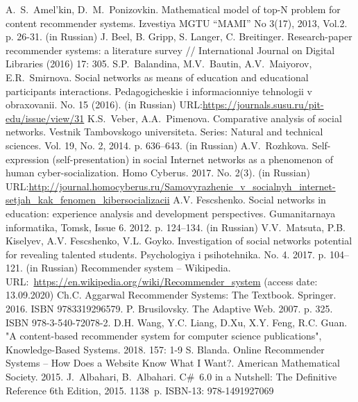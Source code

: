 \documentclass[conference]{IEEEtran}
\begin{document}
\begin{thebibliography}{99}
A.~S.~Amel'kin, D.~M.~Ponizovkin. Mathematical model of top-N problem for content recommender systems. Izvestiya MGTU ``MAMI'' No 3(17), 2013, Vol.2. p. 26-31. (in Russian)
 J. Beel, B. Gripp, S. Langer, C. Breitinger. Research-paper recommender systems: a literature survey // International Journal on Digital Libraries (2016) 17: 305. 
S.P.~Balandina, M.V.~Bautin, A.V.~Maiyorov, E.R.~Smirnova. Social networks as means of education and educational participants interactions. Pedagogicheskie i informacionniye tehnologii v obraxovanii. No. 15 (2016). (in Russian) URL:\url{https://journals.susu.ru/pit-edu/issue/view/31}
K.S.~Veber, A.A.~Pimenova. Comparative analysis of social networks. Vestnik Tambovskogo universiteta. Series: Natural and technical sciences. Vol. 19, No. 2, 2014. p. 636--643. (in Russian)
A.V.~Rozhkova. Self-expression (self-presentation) in social Internet networks as a phenomenon of human cyber-socialization. Homo Cyberus. 2017. No. 2(3). (in Russian) URL:\url{http://journal.homocyberus.ru/Samovyrazhenie_v_socialnyh_internet-setjah_kak_fenomen_kibersocializacii}
 A.V. Fescshenko. Social networks in education: experience analysis and development perspectives. Gumanitarnaya informatika, Tomsk, Issue 6. 2012. p. 124--134. (in Russian)
V.V.~Matsuta, P.B. Kiselyev, A.V. Fescshenko, V.L. Goyko. Investigation of social networks potential for revealing talented students. Psychologiya i psihotehnika. No. 4. 2017. p. 104--121. (in Russian)
Recommender system -- Wikipedia. URL:~\url{https://en.wikipedia.org/wiki/Recommender_system} (access date: 13.09.2020)
Ch.C. Aggarwal Recommender Systems: The Textbook. Springer. 2016. ISBN 9783319296579.
P. Brusilovsky. The Adaptive Web. 2007. p. 325. ISBN 978-3-540-72078-2.
D.H. Wang, Y.C. Liang, D.Xu, X.Y. Feng, R.C. Guan. "A content-based recommender system for computer science publications", Knowledge-Based Systems. 2018. 157: 1-9
S. Blanda. Online Recommender Systems – How Does a Website Know What I Want?. American Mathematical Society. 2015.
 J.~Albahari, B.~Albahari. C\#~6.0 in a Nutshell: The Definitive Reference 6th Edition, 2015. 1138~p. ISBN-13: 978-1491927069

\end{thebibliography}
\end{document}
